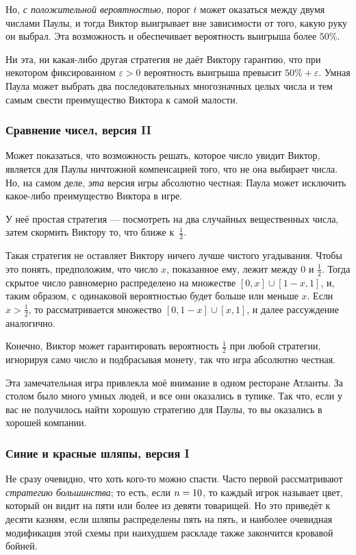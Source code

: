 Но, \emph{с положительной вероятностью}, порог $t$ может оказаться между двумя числами Паулы, и тогда Виктор выигрывает вне зависимости от того, какую руку он выбрал.
Эта возможность и обеспечивает вероятность выигрыша более $50\%$.\heart

Ни эта, ни какая-либо другая стратегия не даёт Виктору гарантию, что при некотором фиксированном $\varepsilon>0$ вероятность выигрыша превысит $50\%+\varepsilon$.
Умная Паула может выбрать два последовательных многозначных целых числа и тем самым свести преимущество Виктора к самой малости.

\subsubsection*{Сравнение чисел, версия II}%

Может показаться, что возможность решать, которое число увидит Виктор, является для Паулы ничтожной компенсацией того, что не она выбирает числа.
Но, на самом деле, \emph{эта} версия игры абсолютно честная:
Паула может исключить какое-либо преимущество Виктора в игре.

У неё простая стратегия --- посмотреть на два случайных вещественных числа, затем скормить Виктору то, что ближе к~$\tfrac12$.

Такая стратегия не оставляет Виктору ничего лучше чистого угадывания.
Чтобы это понять, предположим, что число $x$, показанное ему, лежит между $0$ и $\tfrac12$.
Тогда скрытое число равномерно распределено на множестве $[0,x]\cup [1-x, 1]$, и, таким образом, с одинаковой вероятностью будет больше или меньше $x$.
Если $x>\tfrac12$, то рассматривается множество $[0, 1-x]\cup [x, 1]$, и далее рассуждение аналогично.

Конечно, Виктор может гарантировать вероятность $\tfrac12$ при любой стратегии, игнорируя само число и подбрасывая монету, так что игра абсолютно честная.
\heart

Эта замечательная игра привлекла моё внимание в одном ресторане Атланты.
За столом было много умных людей, и все они оказались в тупике.
Так что, если у вас не получилось найти хорошую стратегию для Паулы, то вы оказались в хорошей компании.

\subsubsection*{Синие и красные шляпы, версия I}%

Не сразу очевидно, что хоть кого-то можно спасти.
Часто первой рассматривают \emph{стратегию большинства};
то есть, если $n\z=10$, то каждый игрок называет цвет, который он видит на пяти или более из девяти товарищей.
Но это приведёт к десяти казням, если шляпы распределены пять на пять, и наиболее очевидная модификация этой схемы при наихудшем раскладе также закончится кровавой бойней.

